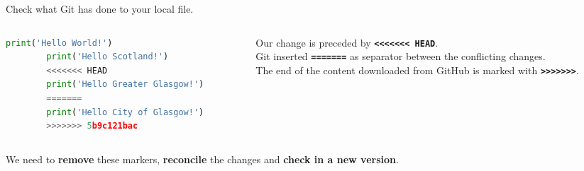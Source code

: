 \begin{frame}[fragile]
\emptyframetitle

  Check what Git has done to your local file.
 \vspace*{0.25cm} 
  \begin{columns}
    \begin{column}{0.59\textwidth}
      \begin{lstlisting}[language=python, basicstyle=\small\ttfamily]
        print('Hello World!')
        print('Hello Scotland!')
        <<<<<<< HEAD
        print('Hello Greater Glasgow!')
        =======
        print('Hello City of Glasgow!')
        >>>>>>> 5b9c121bac
      \end{lstlisting}
    \end{column}
    \begin{column}{0.41\textwidth}
      Our change is preceded by \texttt{\textbf{<<<<<<< HEAD}}.\\[0.2cm]
      Git inserted \texttt{\textbf{=======}} as separator between the conflicting changes.\\[0.2cm]
      The end of the content downloaded from GitHub is marked with \texttt{\textbf{>>>>>>>}}.
    \end{column}
  \end{columns}

  \vspace*{0.5cm}
  We need to \textbf{remove} these markers, \textbf{reconcile} the changes and \textbf{check in a new version}. 

\end{frame}


